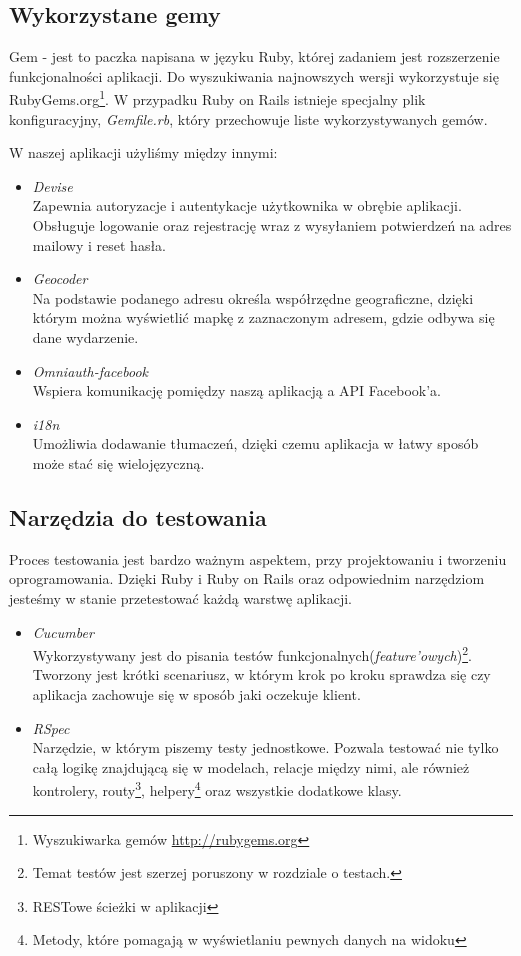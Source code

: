   \subsection{Wykorzystane gemy}
    Gem - jest to paczka napisana w języku Ruby, której zadaniem jest rozszerzenie funkcjonalności aplikacji. Do wyszukiwania najnowszych wersji wykorzystuje się RubyGems.org\footnote{Wyszukiwarka gemów \url{http://rubygems.org}}. W przypadku Ruby on Rails istnieje specjalny plik konfiguracyjny, \emph{Gemfile.rb}, który przechowuje liste wykorzystywanych gemów.

    W naszej aplikacji użyliśmy między innymi:
    \begin{itemize}
      \item \emph{Devise} \\ Zapewnia autoryzacje i autentykacje użytkownika w obrębie aplikacji. Obsługuje logowanie oraz rejestrację wraz z wysyłaniem potwierdzeń na adres mailowy i reset hasła.
      \item \emph{Geocoder} \\ Na podstawie podanego adresu określa współrzędne geograficzne, dzięki którym można wyświetlić mapkę z zaznaczonym adresem, gdzie odbywa się dane wydarzenie.
      \item \emph{Omniauth-facebook} \\ Wspiera komunikację pomiędzy naszą aplikacją a API Facebook'a.
      \item \emph{i18n} \\ Umożliwia dodawanie tłumaczeń, dzięki czemu aplikacja w łatwy sposób może stać się wielojęzyczną.
    \end{itemize}

  \subsection{Narzędzia do testowania}
    Proces testowania jest bardzo ważnym aspektem, przy projektowaniu i tworzeniu oprogramowania. Dzięki Ruby i Ruby on Rails oraz odpowiednim narzędziom jesteśmy w stanie przetestować każdą warstwę aplikacji.

    \begin{itemize}
      \item \emph{Cucumber} \\ Wykorzystywany jest do pisania testów funkcjonalnych(\emph{feature'owych})\footnote{Temat testów jest szerzej poruszony w rozdziale o testach.}. Tworzony jest krótki scenariusz, w którym krok po kroku sprawdza się czy aplikacja zachowuje się w sposób jaki oczekuje klient.
      \item \emph{RSpec} \\ Narzędzie, w którym piszemy testy jednostkowe. Pozwala testować nie tylko całą logikę znajdującą się w modelach, relacje między nimi, ale również kontrolery, routy\footnote{RESTowe ścieżki w aplikacji}, helpery\footnote{Metody, które pomagają w wyświetlaniu pewnych danych na widoku} oraz wszystkie dodatkowe klasy.
    \end{itemize}

